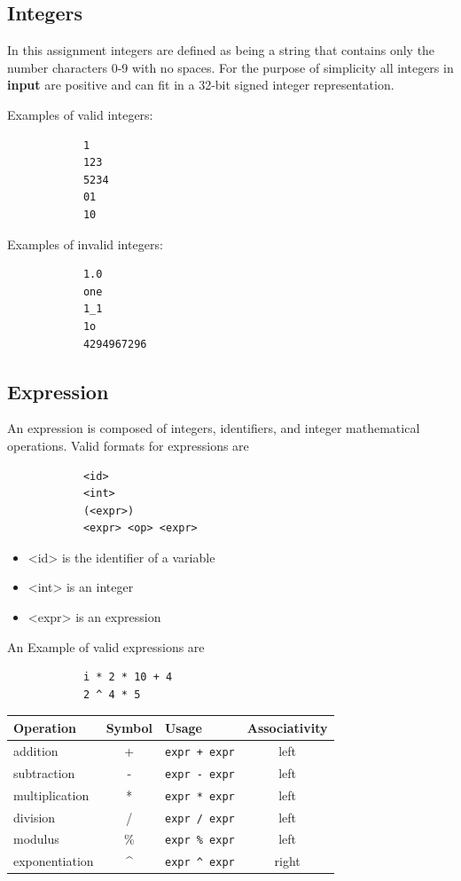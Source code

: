 \documentclass{article}
\newcommand{\code}[1]{\texttt{\textmd{#1}}}
\begin{document}
	\subsection{Integers}

		In this assignment integers are defined as being a string that contains only the number characters 0-9 with no
		spaces. For the purpose of simplicity all integers in \textbf{input} are positive and can fit in a 32-bit signed integer representation.
		
		Examples of valid integers:

		\begin{lstlisting}
			1
			123
			5234
			01
			10
		\end{lstlisting}

		Examples of invalid integers:

		\begin{lstlisting}
			1.0
			one
			1_1
			1o
			4294967296
		\end{lstlisting}


	\subsection{Expression}

		An expression is composed of integers, identifiers, and integer mathematical operations.  Valid formats for
		expressions are

		\begin{lstlisting}
			<id>
			<int>
			(<expr>)
			<expr> <op> <expr>
		\end{lstlisting}

		\begin{itemize}
			\item{<id>} is the identifier of a variable
			\item{<int>} is an integer
			\item{<expr>} is an expression
		\end{itemize}
		
		An Example of valid expressions are

		\begin{lstlisting}
			i * 2 * 10 + 4
			2 ^ 4 * 5
		\end{lstlisting}
		
		\begin{center}
			\begin{tabular}{|l|c|l|c|}
				\hline
				\textbf{Operation} & \textbf{Symbol} & \textbf{Usage} &
				\textbf{Associativity} \\
				\hline
					addition       & +  & \code{expr + expr}  & left \\
					subtraction    & -  & \code{expr - expr}  & left \\
					multiplication & *  & \code{expr * expr}	& left \\
					division       & /  & \code{expr / expr}	& left \\
					modulus        & \% & \code{expr \% expr}	& left \\
					exponentiation & \textasciicircum & \code{expr \textasciicircum\ expr} & right\\
				\hline
			\end{tabular}
		\end{center}
\end{document}
